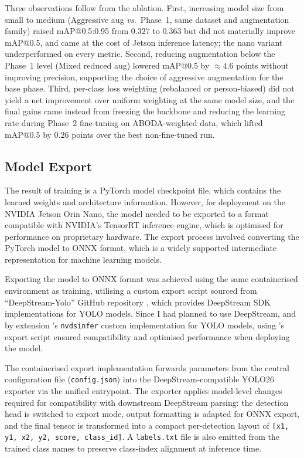 Three observations follow from the ablation. First, increasing model size from
small to medium (Aggressive aug \textit{vs.}\ Phase~1, same dataset and
augmentation family) raised mAP@0.5:0.95 from $0.327$ to $0.363$ but did not
materially improve mAP@0.5, and came at the cost of Jetson inference latency;
the nano variant underperformed on every metric. Second, reducing augmentation
below the Phase~1 level (Mixed reduced aug) lowered mAP@0.5 by $\approx 4.6$
points without improving precision, supporting the choice of aggressive
augmentation for the base phase. Third, per-class loss weighting (rebalanced or
person-biased) did not yield a net improvement over uniform weighting at the
same model size, and the final gains came instead from freezing the backbone
and reducing the learning rate during Phase~2 fine-tuning on ABODA-weighted
data, which lifted mAP@0.5 by $0.26$ points over the best non-fine-tuned run.

\subsection{Model Export}
\label{sec:model_export}

The result of training is a PyTorch model checkpoint file, which contains the
learned weights and architecture information. However, for deployment on the
NVIDIA Jetson Orin Nano, the model needed to be exported to a format compatible
with NVIDIA's TensorRT inference engine, which is optimised for performance on
proprietary hardware. The export process involved converting the PyTorch model
to ONNX format, which is a widely supported intermediate representation for
machine learning models.

Exporting the model to ONNX format was achieved using the same containerised
environment as training, utilising a custom export script sourced from
``DeepStream-Yolo'' GitHub repository \citep{luciano2026deepstreamyolo}, which
provides DeepStream SDK implementations for YOLO models. Since I had planned to
use DeepStream, and by extension \citeauthor{luciano2026deepstreamyolo}'s
\texttt{nvdsinfer} custom implementation for YOLO models, using
\citeauthor{luciano2026deepstreamyolo}'s export script ensured compatibility
and optimised performance when deploying the model.

The containerised export implementation forwards parameters from the central
configuration file (\texttt{config.json}) into the DeepStream-compatible YOLO26
exporter via the unified entrypoint. The exporter applies model-level changes
required for compatibility with downstream DeepStream parsing: the detection
head is switched to export mode, output formatting is adapted for ONNX export,
and the final tensor is transformed into a compact per-detection layout of
\texttt{[x1, y1, x2, y2, score, class\_id]}. A \texttt{labels.txt} file is also
emitted from the trained class names to preserve class-index alignment at
inference time.

